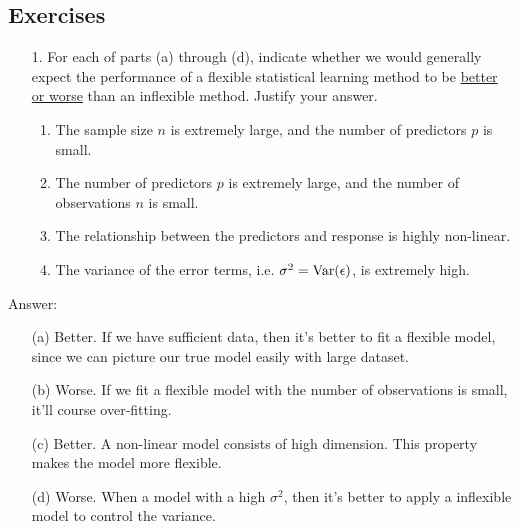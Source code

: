 \documentclass[12pt,a4paper]{article}%
\theoremstyle{definition}
\theoremstyle{plain}
\numberwithin{equation}{section}
\begin{document}
\subsection{\textbf{Exercises}}
\begin{enumerate}
\item[1.] For each of parts (a) through (d), indicate whether we would generally
expect the performance of a flexible statistical learning method to be
\underline{better or worse} than an inflexible method. Justify your answer.
    \begin{enumerate}
        \item The sample size $n$ is extremely large, and the number of predictors $p$ is small.
        \item The number of predictors $p$ is extremely large, and the number of observations $n$ is small.
        \item The relationship between the predictors and response is highly non-linear.
        \item The variance of the error terms, i.e. $\sigma^{2} = {\rm Var}(\epsilon)$, is extremely high.
    \end{enumerate}
\end{enumerate}

\begin{framed}
Answer:
    \begin{enumerate}
        \item[(a)] Better. If we have sufficient data, then it's better to fit a flexible model, since we can picture our true model easily with large dataset.
        \item[(b)] Worse. If we fit a flexible model with the number of observations is small, it'll course over-fitting.
        \item[(c)] Better. A non-linear model consists of high dimension. This property makes the model more flexible.
        \item[(d)] Worse. When a model with a high $\sigma^{2}$, then it's better to apply a inflexible model to control the variance.
    \end{enumerate}
\end{framed}

\end{document}
